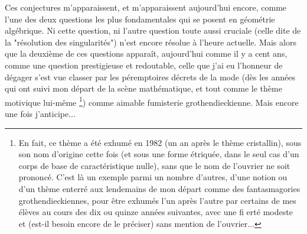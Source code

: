 Ces conjectures m'apparaissent, et m'apparaissent aujourd'hui encore, comme l'une des deux questions les plus fondamentales qui se posent en géométrie algébrique. Ni cette question, ni l'autre question toute aussi cruciale (celle dite de la "résolution des singularités") n'est encore résolue à l'heure actuelle. Mais alors que la deuxième de ces questions apparaît, aujourd'hui comme il y a cent ans, comme une question prestigieuse et redoutable, celle que j'ai eu l'honneur de dégager s'est vue classer par les péremptoires décrets de la mode (dès les années qui ont suivi mon départ de la scène mathématique, et tout comme le thème motivique lui-même \footnote{En fait, ce thème a été exhumé en 1982 (un an après le thème cristallin), sous son nom d'origine cette fois (et sous une forme étriquée, dans le seul cas d'un corps de base de caractéristique nulle), sans que le nom de l'ouvrier ne soit prononcé. C'est là un exemple parmi un nombre d'autres, d'une notion ou d'un thème enterré aux lendemains de mon départ comme des fantasmagories grothendieckiennes, pour être exhumés l'un après l'autre par certains de mes élèves au cours des dix ou quinze années suivantes, avec une fi erté modeste et (est-il besoin encore de le préciser) sans mention de l'ouvrier...}) comme aimable fumisterie grothendieckienne. Mais encore une fois j'anticipe...

